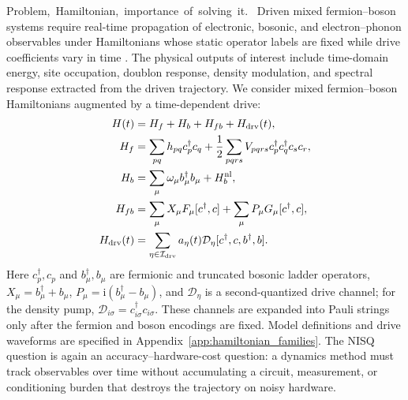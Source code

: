 \documentclass[
  reprint,
  amsmath,
  amssymb,
  aps,
  pra,
  nofootinbib,
  superscriptaddress,
  floatfix
]{revtex4-2}
\newcommand{\placeholder}[1]{\textcolor{red!70!black}{\ifmmode\left[#1\right]\else\textsf{[#1]}\fi}}
\newcommand{\tentative}[1]{\textcolor{red!70!black}{#1}}
\newcommand{\structlabel}[1]{\noindent\mbox{\tentative{#1.}}~}
\newcommand{\Dcal}{\mathcal{D}}
\newcommand{\ii}{\mathrm{i}}
\newcommand{\drv}{\mathrm{drv}}
\begin{document}
\structlabel{Problem, Hamiltonian, importance of solving it}
Driven mixed fermion--boson systems require real-time propagation of electronic, bosonic, and electron--phonon observables under Hamiltonians whose static operator labels are fixed while drive coefficients vary in time \cite{Macridin2018,Macridin2018PRA,Sawaya2020,Li2023,Denner2023}. %
The physical outputs of interest include time-domain energy, site occupation, doublon response, density modulation, and spectral response extracted from the driven trajectory.  We consider mixed fermion--boson Hamiltonians augmented by a time-dependent drive:
\begin{align}
H(t)&=H_f+H_b+H_{fb}+H_{\drv}(t),
\nonumber\\
H_f&=\sum_{pq}h_{pq}c_p^\dagger c_q
+\frac12\sum_{pqrs}V_{pqrs}c_p^\dagger c_q^\dagger c_s c_r,
\nonumber\\
H_b&=\sum_{\mu}\omega_\mu b_\mu^\dagger b_\mu+H_b^{\rm nl},
\nonumber\\
H_{fb}&=\sum_{\mu}X_\mu F_\mu[c^\dagger,c]
+\sum_{\mu}P_\mu G_\mu[c^\dagger,c],
\nonumber\\
H_{\drv}(t)&=\sum_{\eta\in\mathcal I_{\drv}}
a_\eta(t)\Dcal_\eta[c^\dagger,c,b^\dagger,b] .
\label{eq:general_fb_terms_dynamic}
\end{align}
Here $c_p^\dagger,c_p$ and $b_\mu^\dagger,b_\mu$ are fermionic and truncated bosonic ladder operators, $X_\mu=b_\mu^\dagger+b_\mu$, $P_\mu=\ii(b_\mu^\dagger-b_\mu)$, and $\Dcal_\eta$ is a second-quantized drive channel; for the density pump, $\Dcal_{i\sigma}=c_{i\sigma}^{\dagger}c_{i\sigma}$. These channels are expanded into Pauli strings only after the fermion and boson encodings are fixed. Model definitions and drive waveforms are specified in Appendix~\ref{app:hamiltonian_families}.  The NISQ question is again an accuracy--hardware-cost question: a dynamics method must track observables over time without accumulating a circuit, measurement, or conditioning burden that destroys the trajectory on noisy hardware.
\end{document}
